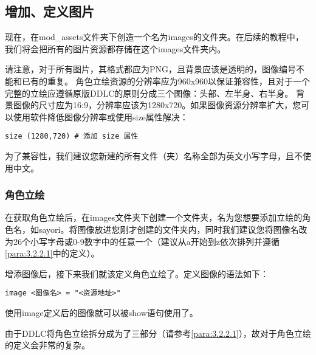 \subsection{增加、定义图片}

现在，在mod\_assets文件夹下创造一个名为images的文件夹。在后续的教程中，我们将会把所有的图片资源都存储在这个images文件夹内。

\begin{Warning}
请注意，对于所有图片，其格式都应为PNG，且背景应该是透明的，图像编号不能和已有的重复。
角色立绘资源的分辨率应为960x960以保证兼容性，且对于一个完整的立绘应遵循原版DDLC的原则分成三个图像：头部、左半身、右半身。
背景图像的尺寸应为16:9，分辨率应该为1280x720。如果图像资源分辨率扩大，您可以使用软件降低图像分辨率或使用size属性解决：
\begin{lstlisting}
size (1280,720) # 添加 size 属性
\end{lstlisting}

为了兼容性，我们建议您新建的所有文件（夹）名称全部为英文小写字母，且不使用中文。
\end{Warning}

\subsubsection{角色立绘}

在获取角色立绘后，在images文件夹下创建一个文件夹，名为您想要添加立绘的角色名，如sayori。将图像放进您刚才创建的文件夹内，同时我们建议您将图像名改为26个小写字母或0-9数字中的任意一个（建议从a开始到z依次排列并遵循\ref{para:3.2.2.1}中的定义）。

增添图像后，接下来我们就该定义角色立绘了。定义图像的语法如下：

\begin{lstlisting}
image <图像名> = "<资源地址>"
\end{lstlisting}

使用image定义后的图像就可以被show语句使用了。


由于DDLC将角色立绘拆分成为了三部分（请参考\ref{para:3.2.2.1}），故对于角色立绘的定义会非常的复杂。

